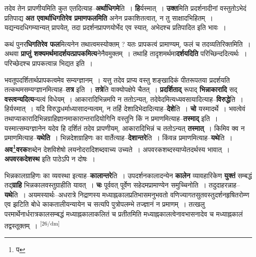 \documentclass[article,12pt,a4paper]{memoir}
\begin{document}
	  \pstart तदेव तेन प्रापणीयमिति कुत एतदित्याह--\textbf{अर्थाधिगमे}ति । \textbf{हि}र्यस्मात् । \textbf{उक्त}मिति प्रदर्शनादीनां वस्तुतोऽभेदं प्रतिपाद्य \textbf{अत एवार्थाधिगतिरेव प्रमाणफलमिति} अनेन प्रकाशितत्वात्, न तु साक्षादभिहितम् । यद्यन्यदधिगम्यान्यत् प्रापयेत्, तदा प्रदर्शनप्रापणयोर्भेद एव स्यात्, अभेदश्च प्रतिपादित इति भावः ।
	\pend
      

	  \pstart कथं पुनर\textbf{धिगतिरेव फल}मित्यनेन तथात्वमस्योक्तम् ? यतः प्रापकत्वं प्रामाण्यम्, फलं च तदव्यतिरिक्तमिति । अथवा \textbf{प्राप्तुं शक्यमर्थमादर्शयत्प्रापकमित्य}नेनैवमुक्तम् । तथाहि तादृशमर्थमा\textbf{दर्शयदिति} परिच्छिन्ददित्यर्थः । परिच्छेदश्च प्रापकत्वान्न भिद्यत इति ।
	\pend
      

	  \pstart भवतूपदर्शितार्थप्रापकत्वमेव सम्यग्ज्ञानम् । यत्तु तदेव प्राप्य वस्तु शङ्खादिकं पीतरूपतया प्रदर्शयति तत्कथमसम्यग्ज्ञानमित्याह--\textbf{तत्र} इति । \textbf{तत्रे}ति वाक्योपक्षेपे चैतत् । \textbf{प्रदर्शिताद्} रूपाद् \textbf{भिन्नाकारादि} सद् \textbf{वस्त्वन्यदित्य}न्यत्वं विधेयम् । आकारादिभिन्नमपि न ततोऽन्यत्, तदेवेदमित्यध्यवसायादित्याह--\textbf{विरुद्धे}ति । हिर्यस्मात् । यदि विरुद्धधर्माध्यासादन्यत्वम्, न तर्हि देशादिभेदादित्याह--\textbf{देशे}ति । \textbf{चो} यस्मादर्थे । भवत्वेवं तथाप्याकारादिभिन्नग्राहिज्ञानमाकारान्तरादियोगिनि वस्तुनि किं न प्रमाणमित्याह--\textbf{तस्माद्} इति । यस्मात्सम्यग्ज्ञानेन यदेव हि दर्शितं तदेव प्रापणीयम्, आकारादिभिन्नं च ततोऽन्यत् \textbf{तस्मात्} । किमिव क्व न प्रमाणमित्याह--\textbf{यथेति} । भिन्नदेशग्राहिणः का वार्तेत्याह--\textbf{देशान्तरे}ति । किंवन्न प्रमाणमित्याह--\textbf{यथे}ति । \textbf{अव\footnote{प}वरक}शब्देन देशविशेषो लयनोदरादिशब्दवाच्य उच्यते । अपवरकशब्दस्याप्येतदर्थस्य भावात् । \textbf{अपवरकदेशस्थ} इति पाठेऽपि न दोषः ।
	\pend
      

	  \pstart भिन्नकालग्राहिणः का व्यवस्था इत्याह--\textbf{कालान्तरे}ति । उपदर्शनकालादन्येन \textbf{कालेन} व्यावहारिकेण \textbf{युक्तं} सम्बद्धं तद्\textbf{ग्राहि} भिन्नकालवस्तुग्राहीति यावत् । \textbf{चः} पूर्ववत् पूर्वेण सहेदमप्रामाण्येन समुच्चिनोति । तदुदाहरन्नाह--\textbf{यथे}ति । अयमस्यार्थः--अधरात्रे निद्राणस्य मध्याह्नकालप्रतिभासमनुभवतो वणिज्यागतसुतवस्तुदर्शनहृषितरोम्ण एव झटिति बोधे काकतालीयन्यायेन च सत्यपि पुत्रोपलम्भे तज्ज्ञानं न प्रमाणम् । तत्खलु परमार्थेनार्धरात्रकालसम्बद्धं मध्याह्नकालाकलितं च प्रतीतमिति मध्याह्नकालत्वेनावभासनादेव च मध्याह्नकालं तद्वस्तूक्तम् ।  \leavevmode\textsuperscript{\rmlatinfont\tiny [26/dm]} 
	  
\end{document}
